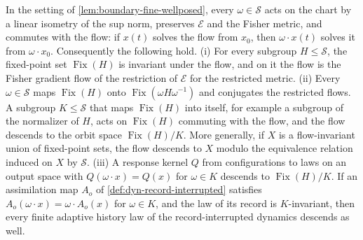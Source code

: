 In the setting of \cref{lem:boundary-fine-wellposed}, every $\omega\in\mathcal S$ acts on the chart by a linear isometry of the sup norm, preserves $\mathcal E$ and the Fisher metric, and commutes with the flow: if $x(t)$ solves the flow from $x_0$, then $\omega\cdot x(t)$ solves it from $\omega\cdot x_0$. Consequently the following hold.
(i) For every subgroup $H\le\mathcal S$, the fixed-point set $\operatorname{Fix}(H)$ is invariant under the flow, and on it the flow is the Fisher gradient flow of the restriction of $\mathcal E$ for the restricted metric.
(ii) Every $\omega\in\mathcal S$ maps $\operatorname{Fix}(H)$ onto $\operatorname{Fix}(\omega H\omega^{-1})$ and conjugates the restricted flows. A subgroup $K\le\mathcal S$ that maps $\operatorname{Fix}(H)$ into itself, for example a subgroup of the normalizer of $H$, acts on $\operatorname{Fix}(H)$ commuting with the flow, and the flow descends to the orbit space $\operatorname{Fix}(H)/K$. More generally, if $X$ is a flow-invariant union of fixed-point sets, the flow descends to $X$ modulo the equivalence relation induced on $X$ by $\mathcal S$.
(iii) A response kernel $Q$ from configurations to laws on an output space with $Q(\omega\cdot x)=Q(x)$ for $\omega\in K$ descends to $\operatorname{Fix}(H)/K$. If an assimilation map $A_o$ of \cref{def:dyn-record-interrupted} satisfies $A_o(\omega\cdot x)=\omega\cdot A_o(x)$ for $\omega\in K$, and the law of its record is $K$-invariant, then every finite adaptive history law of the record-interrupted dynamics descends as well.


